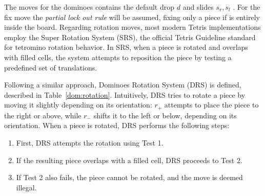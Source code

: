 The moves for the dominoes contains the default drop $d$ and slides $s_r, s_l$ . For the fix move the \emph{partial lock out rule}\cite{WikiFandom} will be assumed, fixing only a piece if is entirely  inside the board. Regarding rotation moves, most modern Tetris implementations employ the Super Rotation System (SRS), the official Tetris Guideline standard for tetromino rotation behavior\cite{SRS}. In SRS, when a piece is rotated and overlaps with filled cells, the system attempts to reposition the piece by testing a predefined set of translations. 

\vspace{1em}

Following a similar approach, Dominoes Rotation System (DRS) is defined, described in Table~\ref{dom:rotation}. Intuitively, DRS tries to rotate a piece by moving it slightly depending on its orientation: \(r_+\) attempts to place the piece to the right or above, while \(r_-\) shifts it to the left or below, depending on its orientation. When a piece is rotated, DRS performs the following steps:
\begin{enumerate}
    \item First, DRS attempts the rotation using Test 1. 
    \item If the resulting piece overlaps with a filled cell, DRS proceeds to Test 2. 
    \item If Test 2 also fails, the piece cannot be rotated, and the move is deemed illegal.
\end{enumerate}



